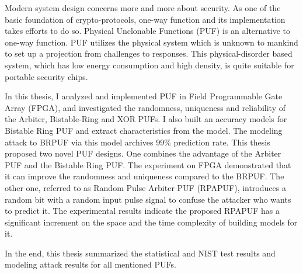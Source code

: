 \begin{eabstract}
Modern system design concerns more and more about security. As one of the basic foundation of crypto-protocols, one-way function and its implementation takes efforts to do so. Physical Unclonable Functions (PUF) is an alternative to one-way function. PUF utilizes the physical system which is unknown to mankind to set up a projection from challenges to responses. This physical-disorder based system, which has low energy consumption and high density, is quite suitable for portable security chips.

In this thesis, I analyzed and implemented PUF in Field Programmable Gate Array (FPGA), and investigated the randomness, uniqueness and reliability of the Arbiter, Bistable-Ring and XOR PUFs.
I also built an accuracy models for Bistable Ring PUF and extract characteristics from the model. The modeling attack to BRPUF via this model archives 99\% prediction rate.
This thesis proposed two novel PUF designs. One combines the advantage of the Arbiter PUF and the Bistable Ring PUF. The experiment on FPGA demonstrated that it can improve the randomness and uniqueness compared to the BRPUF.
The other one, referred to as Random Pulse Arbiter PUF (RPAPUF), introduces a random bit with a random input pulse signal to confuse the attacker who wants to predict it. The experimental results indicate the proposed RPAPUF has a significant increment on the space and the time complexity of building models for it.

In the end, this thesis summarized the statistical and NIST test results and modeling attack results for all mentioned PUFs.

\end{eabstract}


